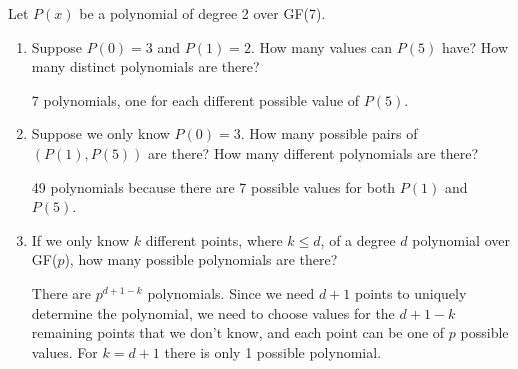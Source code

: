 \question 
Let $P(x)$ be a polynomial of degree 2 over GF(7).

\begin{enumerate}
    \item 
        Suppose $P(0) = 3$ and $P(1) = 2$.
        How many values can $P(5)$ have?
        How many distinct polynomials are there?

        \begin{solution}[0.8 in]
            7 polynomials, one for each different possible value of $P(5)$.
        \end{solution}

    \item
        Suppose we only know $P(0) = 3$.
        How many possible pairs of $(P(1), P(5))$ are there?
        How many different polynomials are there?

        \begin{solution}[0.8 in]
            49 polynomials because there are 7 possible values for both $P(1)$ and $P(5)$. 
        \end{solution}

    \item
        If we only know $k$ different points, where $k \leq d$, of a degree $d$ polynomial over GF($p$), how many possible polynomials are there?

        \begin{solution}[0.8 in]
            There are $p^{d+1-k}$ polynomials.
            Since we need $d+1$ points to uniquely determine the polynomial, we need to choose values for the $d+1-k$ remaining points that we don't know, and each point can be one of $p$ possible values.
            For $k = d+1$ there is only 1 possible polynomial.
        \end{solution}
\end{enumerate}
